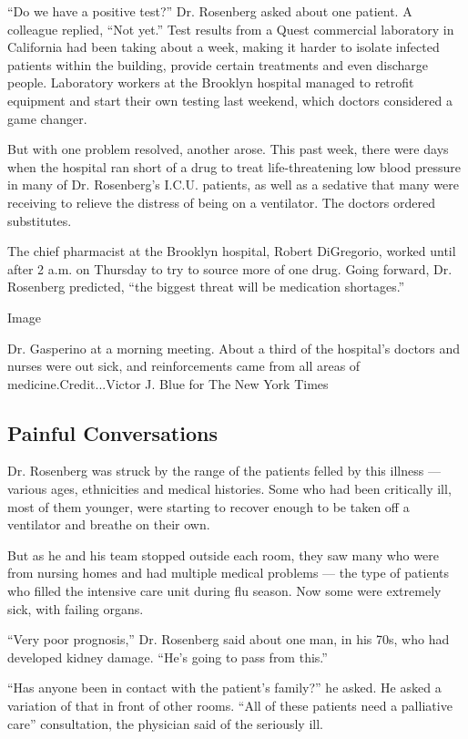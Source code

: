 ``Do we have a positive test?'' Dr. Rosenberg asked about one patient. A
colleague replied, ``Not yet.'' Test results from a Quest commercial
laboratory in California had been taking about a week, making it harder
to isolate infected patients within the building, provide certain
treatments and even discharge people. Laboratory workers at the Brooklyn
hospital managed to retrofit equipment and start their own testing last
weekend, which doctors considered a game changer.

But with one problem resolved, another arose. This past week, there were
days when the hospital ran short of a drug to treat life-threatening low
blood pressure in many of Dr. Rosenberg's I.C.U. patients, as well as a
sedative that many were receiving to relieve the distress of being on a
ventilator. The doctors ordered substitutes.

The chief pharmacist at the Brooklyn hospital, Robert DiGregorio, worked
until after 2 a.m. on Thursday to try to source more of one drug. Going
forward, Dr. Rosenberg predicted, ``the biggest threat will be
medication shortages.''

Image

Dr. Gasperino at a morning meeting. About a third of the hospital's
doctors and nurses were out sick, and reinforcements came from all areas
of medicine.Credit...Victor J. Blue for The New York Times

\hypertarget{painful-conversations}{%
\subsection{Painful Conversations}\label{painful-conversations}}

Dr. Rosenberg was struck by the range of the patients felled by this
illness --- various ages, ethnicities and medical histories. Some who
had been critically ill, most of them younger, were starting to recover
enough to be taken off a ventilator and breathe on their own.

But as he and his team stopped outside each room, they saw many who were
from nursing homes and had multiple medical problems --- the type of
patients who filled the intensive care unit during flu season. Now some
were extremely sick, with failing organs.

``Very poor prognosis,'' Dr. Rosenberg said about one man, in his 70s,
who had developed kidney damage. ``He's going to pass from this.''

``Has anyone been in contact with the patient's family?'' he asked. He
asked a variation of that in front of other rooms. ``All of these
patients need a palliative care'' consultation, the physician said of
the seriously ill.

